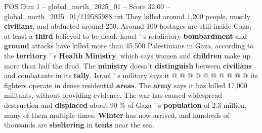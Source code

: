 \begin{textsample}{POS Dim 1 – global\_north\_2025\_01 – Score 32.00 – global\_north\_2025\_01/119585988.txt}
They killed around 1,200 people, mostly \textbf{civilians}, and abducted around 250.
Around 100 hostages are still inside Gaza, at least a \textbf{third} believed to be dead.
Israel ' s retaliatory \textbf{bombardment} and \textbf{ground} attacks have killed more than 45,500 Palestinians in Gaza, according to the \textbf{territory} ' s \textbf{Health} \textbf{Ministry}, which says women and \textbf{children} make up more than half the dead.
The \textbf{ministry} doesn't \textbf{distinguish} between \textbf{civilians} and combatants in its \textbf{tally}.
Israel ' s military says it @ @ @ @ @ @ @ @ @ @ its fighters operate in dense residential \textbf{areas}.
The \textbf{army} says it has killed 17,000 militants, without providing evidence.
The war has caused widespread destruction and \textbf{displaced} about 90 \% of Gaza ' s \textbf{population} of 2.3 million, many of them multiple times. \textbf{Winter} has now arrived, and hundreds of thousands are \textbf{sheltering} in \textbf{tents} near the sea.

\end{textsample}
